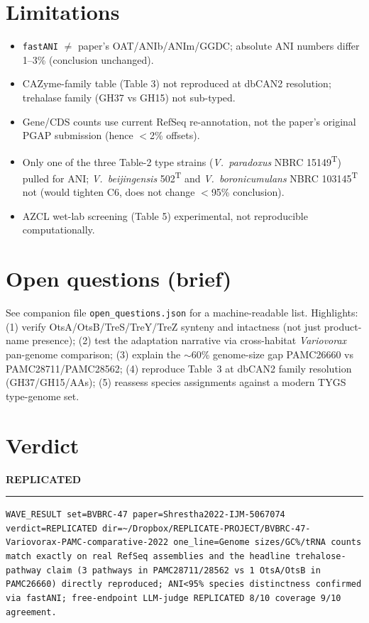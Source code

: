 \documentclass[11pt]{article}
\begin{document}
\section{Limitations}

\begin{itemize}[leftmargin=1.4em]
  \item \texttt{fastANI} $\neq$ paper's OAT/ANIb/ANIm/GGDC; absolute ANI numbers differ 1--3\%
        (conclusion unchanged).
  \item CAZyme-family table (Table 3) not reproduced at dbCAN2 resolution; trehalase family
        (GH37 vs GH15) not sub-typed.
  \item Gene/CDS counts use current RefSeq re-annotation, not the paper's original PGAP
        submission (hence $<$2\% offsets).
  \item Only one of the three Table-2 type strains (\emph{V.\ paradoxus} NBRC 15149\textsuperscript{T})
        pulled for ANI; \emph{V.\ beijingensis} 502\textsuperscript{T} and
        \emph{V.\ boronicumulans} NBRC 103145\textsuperscript{T} not (would tighten C6, does
        not change $<$95\% conclusion).
  \item AZCL wet-lab screening (Table 5) experimental, not reproducible computationally.
\end{itemize}

\section{Open questions (brief)}

See companion file \texttt{open\_questions.json} for a machine-readable list. Highlights:
(1) verify OtsA/OtsB/TreS/TreY/TreZ synteny and intactness (not just product-name presence);
(2) test the adaptation narrative via cross-habitat \emph{Variovorax} pan-genome
comparison; (3) explain the $\sim$60\% genome-size gap PAMC26660 vs PAMC28711/PAMC28562;
(4) reproduce Table~3 at dbCAN2 family resolution (GH37/GH15/AAs); (5) reassess species
assignments against a modern TYGS type-genome set.

\section*{Verdict}
\begin{center}
\Large\textbf{REPLICATED}
\end{center}

\vspace{1em}
\hrule
\vspace{0.5em}
\small\texttt{WAVE\_RESULT set=BVBRC-47 paper=Shrestha2022-IJM-5067074 verdict=REPLICATED
dir=\textasciitilde/Dropbox/REPLICATE-PROJECT/BVBRC-47-Variovorax-PAMC-comparative-2022
one\_line=Genome sizes/GC\%/tRNA counts match exactly on real RefSeq assemblies and the
headline trehalose-pathway claim (3 pathways in PAMC28711/28562 vs 1 OtsA/OtsB in PAMC26660)
directly reproduced; ANI<95\% species distinctness confirmed via fastANI; free-endpoint
LLM-judge REPLICATED 8/10 coverage 9/10 agreement.}
\end{document}
